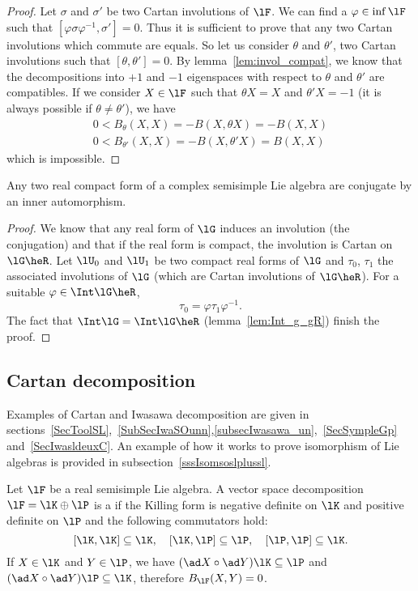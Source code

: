 \begin{proof}
Let $\sigma$ and $\sigma'$ be two Cartan involutions of $\lF$. We can find a $\varphi\in\inf\lF$ such that $[\varphi\sigma\varphi^{-1},\sigma']=0$. Thus it is sufficient to prove that any two Cartan involutions which commute are equals. So let us consider $\theta$ and $\theta'$, two Cartan involutions such that $[\theta,\theta']=0$. By lemma~\ref{lem:invol_compat}, we know that the decompositions into $+1$ and $-1$  eigenspaces with respect to $\theta$ and $\theta'$ are compatibles. If we consider $X\in\lF$ such that $\theta X=X$ and $\theta' X=-1$ (it is always possible if $\theta\neq\theta'$), we have
\[
\begin{split}
  0<B_{\theta}(X,X)=-B(X,\theta X)=-B(X,X)\\
  0<B_{\theta'}(X,X)=-B(X,\theta' X)=B(X,X)
\end{split}
\]
which is impossible.
\end{proof}

\begin{corollary}
Any two real compact form of a complex semisimple Lie algebra are conjugate by an inner automorphism.
\end{corollary}

\begin{proof}
We know that any real form of $\lG$ induces an involution (the conjugation) and that if the real form is compact, the involution is Cartan on $\lG\heR$. Let $\lU_0$ and $\lU_1$ be two compact real forms of $\lG$ and $\tau_0$, $\tau_1$ the associated involutions of $\lG$ (which are Cartan involutions of $\lG\heR$). For a suitable $\varphi\in\Int\lG\heR$,
\[
   \tau_0=\varphi\tau_1\varphi^{-1}.
\]
The fact that $\Int\lG=\Int\lG\heR$ (lemma~\ref{lem:Int_g_gR}) finish the proof.

\end{proof}
\subsection{Cartan decomposition}

Examples of Cartan and Iwasawa decomposition are given in sections~\ref{SecToolSL},~\ref{SubSecIwaSOunn},\ref{subsecIwasawa_un},~\ref{SecSympleGp} and~\ref{SecIwasldeuxC}. An example of how it works to prove isomorphism of Lie algebras is provided in subsection~\ref{sssIsomsoslplussl}.

Let $\lF$ be a real semisimple Lie algebra. A vector space decomposition $\lF=\lK\oplus\lP$ is a  if the Killing form is negative definite on $\lK$ and positive definite on $\lP$ and the following commutators hold:
\begin{equation}\label{eq:comm_Cartan}
   [\lK,\lK]\subseteq\lK,\quad[\lK,\lP]\subseteq\lP,\quad[\lP,\lP]\subseteq\lK.
\end{equation}
If $X\in\lK$ and $Y\in\lP$, we have $(\ad X\circ\ad Y)\lK\subseteq\lP$ and $(\ad X\circ\ad Y)\lP\subseteq\lK$, therefore $B_{\lF}(X,Y)=0$.

